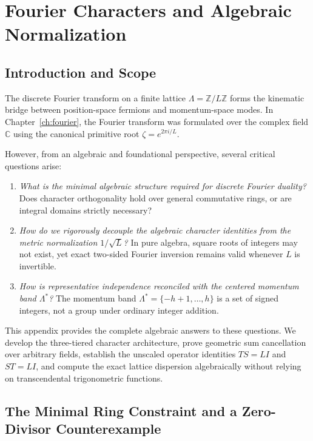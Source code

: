 \chapter{Fourier Characters and Algebraic Normalization}
\label{app:fourier_characters}

\section{Introduction and Scope}

The discrete Fourier transform on a finite lattice $\Lambda = \mathbb{Z}/L\mathbb{Z}$ forms the kinematic bridge between position-space fermions and momentum-space modes. In Chapter~\ref{ch:fourier}, the Fourier transform was formulated over the complex field $\mathbb{C}$ using the canonical primitive root $\zeta = e^{2\pi i / L}$.

However, from an algebraic and foundational perspective, several critical questions arise:
\begin{enumerate}
    \item \emph{What is the minimal algebraic structure required for discrete Fourier duality?} Does character orthogonality hold over general commutative rings, or are integral domains strictly necessary?
    \item \emph{How do we rigorously decouple the algebraic character identities from the metric normalization $1/\sqrt{L}$?} In pure algebra, square roots of integers may not exist, yet exact two-sided Fourier inversion remains valid whenever $L$ is invertible.
    \item \emph{How is representative independence reconciled with the centered momentum band $\Lambda^*$?} The momentum band $\Lambda^* = \{-h+1, \dots, h\}$ is a set of signed integers, not a group under ordinary integer addition.
\end{enumerate}

This appendix provides the complete algebraic answers to these questions. We develop the three-tiered character architecture, prove geometric sum cancellation over arbitrary fields, establish the unscaled operator identities $T S = L I$ and $S T = L I$, and compute the exact lattice dispersion algebraically without relying on transcendental trigonometric functions.

\section{The Minimal Ring Constraint and a Zero-Divisor Counterexample}

